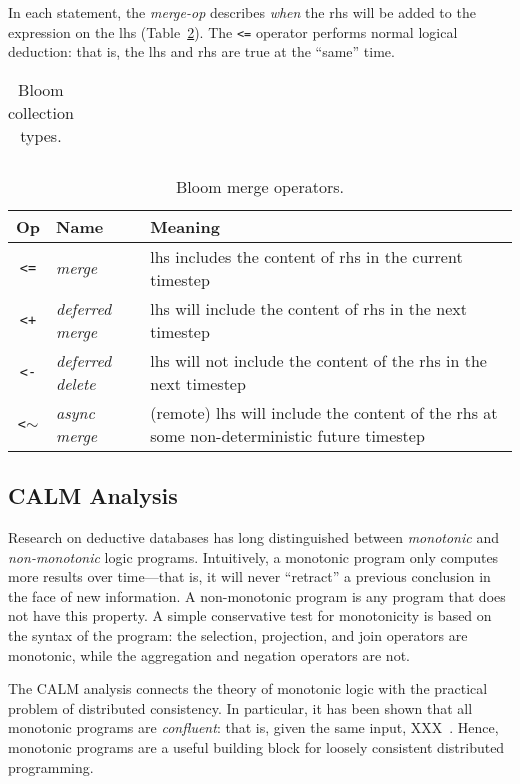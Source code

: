 In each statement, the \emph{merge-op} describes \emph{when} the rhs will be
added to the expression on the lhs (Table~\ref{tbl:bloom-ops}). The \verb|<=|
operator performs normal logical deduction: that is, the lhs and rhs are true at
the ``same'' time.

\begin{table}
\begin{tabular}{|c|l|}
\end{tabular}
\caption{Bloom collection types.}
\label{tbl:bloom-collections}
\end{table}

\begin{table}
\begin{tabular}{|c|l|p{1.85in}|}
\hline
\textbf{Op} & \textbf{Name} & \textbf{Meaning} \\
\hline
\verb|<=| & \emph{merge} & lhs includes the content of rhs in the
current timestep \\
\hline
\verb|<+| & \emph{deferred merge} & lhs will include the content of rhs in the
next timestep \\
\hline
\verb|<-| & \emph{deferred delete} & lhs will not include the content of the rhs
in the next timestep \\
\hline
\verb|<|$\sim$ & \emph{async merge} & (remote) lhs will include the content of the
rhs at some non-deterministic future timestep\\
\hline
\end{tabular}
\caption{Bloom merge operators.}
\label{tbl:bloom-ops}
\end{table}

\subsection{CALM Analysis}
\label{sec:bg-calm}

Research on deductive databases has long distinguished between \emph{monotonic}
and \emph{non-monotonic} logic programs. Intuitively, a monotonic program only
computes more results over time---that is, it will never ``retract'' a previous
conclusion in the face of new information. A non-monotonic program is any
program that does not have this property. A simple conservative test for
monotonicity is based on the syntax of the program: the selection, projection,
and join operators are monotonic, while the aggregation and negation operators
are not.

The CALM analysis connects the theory of monotonic logic with the practical
problem of distributed consistency. In particular, it has been shown that all
monotonic programs are \emph{confluent}: that is, given the same input,
XXX~\cite{Ameloot2011}. Hence, monotonic programs are a useful building block
for loosely consistent distributed programming.

